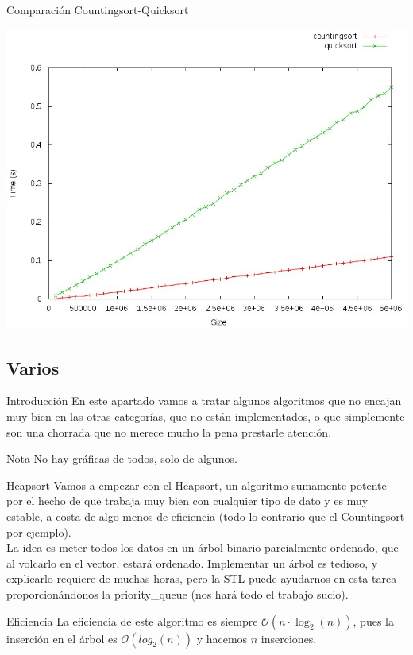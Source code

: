 \documentclass[compress]{beamer}
\begin{document}
\begin{frame}{Comparación Countingsort-Quicksort}
	\begin{alertblock}{}
		\begin{center}
		\includegraphics[scale=0.40]{images/coun-quic.jpeg}
		\end{center}
	\end{alertblock}
\end{frame}

\subsection{Varios}

\begin{frame}{Introducción}
En este apartado vamos a tratar algunos algoritmos que no encajan muy bien en las otras categorías, que no están implementados, o que simplemente son una chorrada que no merece mucho la pena prestarle atención.\\
\vspace{0.20in}
	\begin{exampleblock}{Nota}
	No hay gráficas de todos, solo de algunos.
	\end{exampleblock}
\end{frame}

\begin{frame}{Heapsort}
Vamos a empezar con el Heapsort, un algoritmo sumamente potente por el hecho de que trabaja muy bien con cualquier tipo de dato y es muy estable, a costa de algo menos de eficiencia (todo lo contrario que el Countingsort por ejemplo).\\
\vspace{0.20in}
La idea es meter todos los datos en un árbol binario parcialmente ordenado, que al volcarlo en el vector, estará ordenado. Implementar un árbol es tedioso, y explicarlo requiere de muchas horas, pero la STL puede ayudarnos en esta tarea proporcionándonos la priority\_queue (nos hará todo el trabajo sucio).\\
	\begin{block}{Eficiencia}
	La eficiencia de este algoritmo es siempre $\mathcal{O}(n\cdot\log_2(n))$, pues la inserción en el árbol es $\mathcal{O}(log_2(n))$ y hacemos $n$ inserciones.
	\end{block}
\end{frame}
\end{document}
